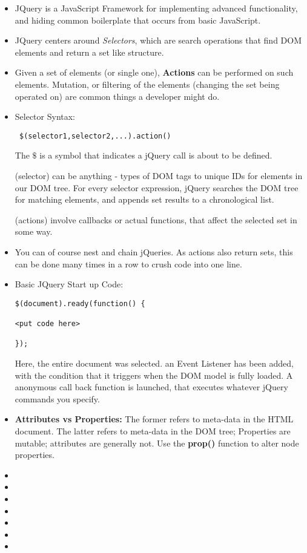 \documentclass[8pt,a4paper]{extarticle}
\begin{document}
\begin{itemize}
\item JQuery is a JavaScript Framework for implementing advanced functionality,
and hiding common boilerplate that occurs from basic JavaScript.
\item JQuery centers around \textit{Selectors}, which are search operations that
find DOM elements and return a set like structure. 
\item Given a set of elements (or single one), \textbf{Actions} can be performed on such elements. Mutation, or filtering of the elements (changing the set being operated on) are common things a developer might do.
\item Selector Syntax:

\begin{verbatim}
 $(selector1,selector2,...).action()
\end{verbatim}

The \textbf{$\$$ }is a symbol that indicates a jQuery call is about to be defined. 

(selector) can be anything - types of DOM tags to unique IDs for elements in our DOM tree. For every selector expression, jQuery searches the DOM tree for matching elements, and appends set results to a chronological list.

(actions) involve callbacks or actual functions, that affect the selected set in some way.

\item You can of course nest and chain jQueries. As actions also return sets, this can be done many times in a row to crush code into one line.


\item Basic JQuery Start up Code:

\begin{verbatim}
$(document).ready(function() {

<put code here>

});

\end{verbatim}

Here, the entire document was selected. an Event Listener has been added, with the condition that it triggers when the DOM model is fully loaded. A anonymous call back function is launched, that executes whatever jQuery commands you specify.


\item \textbf{Attributes vs Properties:} The former refers to meta-data in the HTML document. The latter refers to meta-data in the DOM tree; Properties are mutable; attributes are generally not. Use the \textbf{prop()} function to alter node properties.
\item
\item
\item
\item
\item
\item
\item

\end{itemize}
\end{document}
